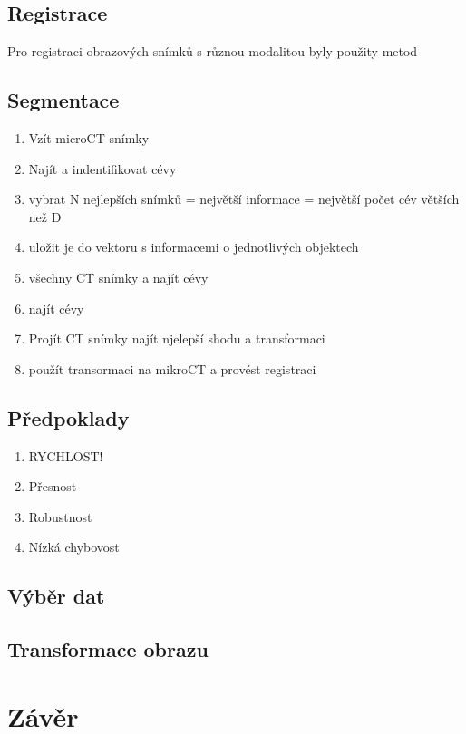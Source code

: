 \documentclass{thesis}%
\begin{document}
\section{Registrace}
Pro registraci obrazových snímků s různou modalitou byly použity metod
\section{Segmentace}


\begin{enumerate}
\item Vzít microCT snímky
\item Najít a indentifikovat cévy 
\item vybrat N nejlepších snímků = největší informace = největší počet cév větších než D
\item uložit je do vektoru s informacemi o jednotlivých objektech
\item všechny CT snímky a najít cévy
\item najít cévy
\item Projít CT snímky najít njelepší shodu a transformaci
\item použít transormaci na mikroCT a provést registraci
\end{enumerate}

\section{Předpoklady}
\begin{enumerate}
\item RYCHLOST!
\item Přesnost
\item Robustnost
\item Nízká chybovost
\end{enumerate}
\section{Výběr dat }
\section{Transformace obrazu}


\chapter{Závěr}

\newpage
\listoffigures
\listoftables
\end{document}
